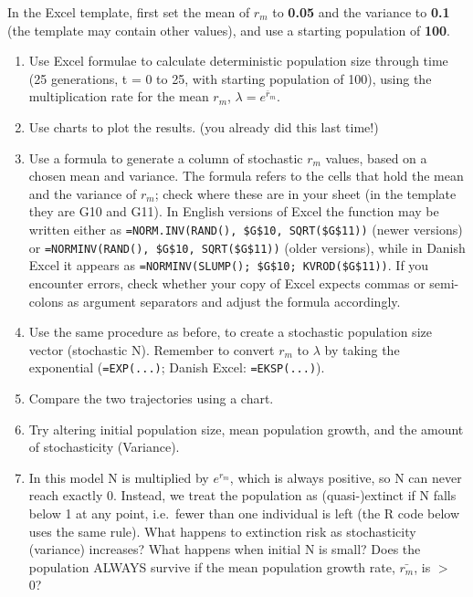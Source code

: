 \documentclass[
  a4paper]{book}
\providecommand{\tightlist}{%
  \setlength{\itemsep}{0pt}\setlength{\parskip}{0pt}}
\begin{document}
In the Excel template, first set the mean of \(r_m\) to \textbf{0.05} and the variance to \textbf{0.1} (the template may contain other values), and use a starting population of \textbf{100}.

\begin{enumerate}
\def\labelenumi{\arabic{enumi})}
\tightlist
\item
  Use Excel formulae to calculate deterministic population size through time (25 generations, t = 0 to 25, with starting population of 100), using the multiplication rate for the mean \(r_m\), \(\lambda = e^{\bar{r}_m}\).
\item
  Use charts to plot the results. (you already did this last time!)
\item
  Use a formula to generate a column of stochastic \(r_m\) values, based on a chosen mean and variance. The formula refers to the cells that hold the mean and the variance of \(r_m\); check where these are in your sheet (in the template they are G10 and G11). In English versions of Excel the function may be written either as \texttt{=NORM.INV(RAND(),\ \$G\$10,\ SQRT(\$G\$11))} (newer versions) or \texttt{=NORMINV(RAND(),\ \$G\$10,\ SQRT(\$G\$11))} (older versions), while in Danish Excel it appears as \texttt{=NORMINV(SLUMP();\ \$G\$10;\ KVROD(\$G\$11))}. If you encounter errors, check whether your copy of Excel expects commas or semi-colons as argument separators and adjust the formula accordingly.
\item
  Use the same procedure as before, to create a stochastic population size vector (stochastic N). Remember to convert \(r_m\) to \(\lambda\) by taking the exponential (\texttt{=EXP(...)}; Danish Excel: \texttt{=EKSP(...)}).
\item
  Compare the two trajectories using a chart.
\item
  Try altering initial population size, mean population growth, and the amount of stochasticity (Variance).
\item
  In this model N is multiplied by \(e^{r_m}\), which is always positive, so N can never reach exactly 0. Instead, we treat the population as (quasi-)extinct if N falls below 1 at any point, i.e.~fewer than one individual is left (the R code below uses the same rule). What happens to extinction risk as stochasticity (variance) increases? What happens when initial N is small? Does the population ALWAYS survive if the mean population growth rate, \(\bar{r_m}\), is \(>\) 0?
\end{enumerate}
\end{document}
